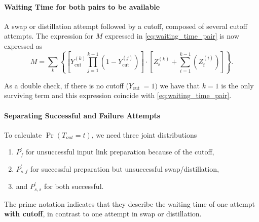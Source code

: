 \documentclass{masterthesis}
\begin{document}
\paragraph*{Waiting Time for both pairs to be available}

A swap or distillation attempt followed by a cutoff, composed of several cutoff attempts. The expression for $M$ expressed in \ref{eq:waiting_time_pair} is now expressed as
\begin{equation}
    M = \sum_{k}\left\{\left[Y_{\text {cut }}^{(k)} \prod_{j=1}^{k-1}\left(1-Y_{\text {cut }}^{(j)}\right)\right] \cdot\left[Z_{\mathrm{s}}^{(k)}+\sum_{i=1}^{k-1}\left(Z_{\mathrm{f}}^{(i)}\right)\right]\right\} .    
\end{equation}

As a double check, if there is no cutoff ($Y_{\text {cut }}=1)$ we have that $k=1$ is the only surviving term and this expression coincide with \ref{eq:waiting_time_pair}.

\paragraph*{Separating Successful and Failure Attempts}

To calculate $\Pr(T_{out} = t)$, we need three joint distributions
\begin{enumerate}
    \item $P_f^{\prime}$ for unsuccessful input link preparation because of the cutoff,
    \item $P_{s, f}^{\prime}$ for successful preparation but unsuccessful swap/distillation,
    \item and $P_{s, s}^{\prime}$ for both successful.
\end{enumerate}

The prime notation indicates that they describe the waiting time of one attempt \textbf{with cutoff}, in contrast to one attempt in swap or distillation.
\end{document}
